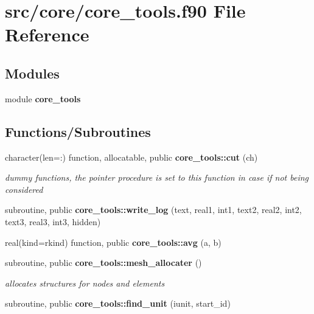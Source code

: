 \section{src/core/core\+\_\+tools.f90 File Reference}
\label{core__tools_8f90}
\subsection*{Modules}
\begin{DoxyCompactItemize}
\item 
module {\bf core\+\_\+tools}
\end{DoxyCompactItemize}
\subsection*{Functions/\+Subroutines}
\begin{DoxyCompactItemize}
\item 
character(len=\+:) function, allocatable, public {\bf core\+\_\+tools\+::cut} (ch)
\begin{DoxyCompactList}\small\item\em dummy functions, the pointer procedure is set to this function in case if not being considered \end{DoxyCompactList}\item 
subroutine, public {\bf core\+\_\+tools\+::write\+\_\+log} (text, real1, int1, text2, real2, int2, text3, real3, int3, hidden)
\item 
real(kind=rkind) function, public {\bf core\+\_\+tools\+::avg} (a, b)
\item 
subroutine, public {\bf core\+\_\+tools\+::mesh\+\_\+allocater} ()
\begin{DoxyCompactList}\small\item\em allocates structures for nodes and elements \end{DoxyCompactList}\item 
subroutine, public {\bf core\+\_\+tools\+::find\+\_\+unit} (iunit, start\+\_\+id)
\end{DoxyCompactItemize}
